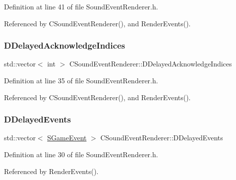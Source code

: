 Definition at line 41 of file Sound\+Event\+Renderer.\+h.



Referenced by C\+Sound\+Event\+Renderer(), and Render\+Events().

\hypertarget{classCSoundEventRenderer_a8e36efd07e98242ea3a80564c595e397}{}\label{classCSoundEventRenderer_a8e36efd07e98242ea3a80564c595e397} 
\subsubsection{\texorpdfstring{D\+Delayed\+Acknowledge\+Indices}{DDelayedAcknowledgeIndices}}
{\footnotesize\ttfamily std\+::vector$<$ int $>$ C\+Sound\+Event\+Renderer\+::\+D\+Delayed\+Acknowledge\+Indices\hspace{0.3cm}{\ttfamily [protected]}}



Definition at line 35 of file Sound\+Event\+Renderer.\+h.



Referenced by C\+Sound\+Event\+Renderer(), and Render\+Events().

\hypertarget{classCSoundEventRenderer_a896d5c4717b407fdb6567aed87da3e50}{}\label{classCSoundEventRenderer_a896d5c4717b407fdb6567aed87da3e50} 
\subsubsection{\texorpdfstring{D\+Delayed\+Events}{DDelayedEvents}}
{\footnotesize\ttfamily std\+::vector$<$ \hyperlink{structSGameEvent}{S\+Game\+Event} $>$ C\+Sound\+Event\+Renderer\+::\+D\+Delayed\+Events\hspace{0.3cm}{\ttfamily [protected]}}



Definition at line 30 of file Sound\+Event\+Renderer.\+h.



Referenced by Render\+Events().

\hypertarget{classCSoundEventRenderer_ab2103a634f4ba6d12824ecddf6693870}{}\label{classCSoundEventRenderer_ab2103a634f4ba6d12824ecddf6693870} 
